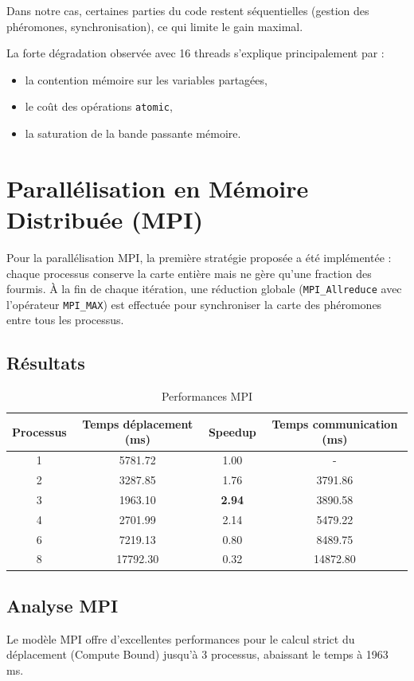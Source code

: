 \documentclass[12pt, a4paper]{article}
\begin{document}
Dans notre cas, certaines parties du code restent séquentielles (gestion des phéromones, synchronisation), ce qui limite le gain maximal.

La forte dégradation observée avec 16 threads s’explique principalement par :

\begin{itemize}
\item la contention mémoire sur les variables partagées,
\item le coût des opérations \texttt{atomic},
\item la saturation de la bande passante mémoire.
\end{itemize}

\section{Parallélisation en Mémoire Distribuée (MPI)}

Pour la parallélisation MPI, la première stratégie proposée a été implémentée : chaque processus conserve la carte entière mais ne gère qu'une fraction des fourmis. À la fin de chaque itération, une réduction globale (\texttt{MPI\_Allreduce} avec l'opérateur \texttt{MPI\_MAX}) est effectuée pour synchroniser la carte des phéromones entre tous les processus.

\subsection{Résultats}

\begin{table}[H]
\centering
\begin{tabular}{cccc}
\toprule
Processus & Temps déplacement (ms) & Speedup & Temps communication (ms) \\
\midrule
1 & 5781.72 & 1.00 & - \\
2 & 3287.85 & 1.76 & 3791.86 \\
3 & 1963.10 & \textbf{2.94} & 3890.58 \\
4 & 2701.99 & 2.14 & 5479.22 \\
6 & 7219.13 & 0.80 & 8489.75 \\
8 & 17792.30 & 0.32 & 14872.80 \\
\bottomrule
\end{tabular}
\caption{Performances MPI}
\end{table}

\subsection{Analyse MPI}
Le modèle MPI offre d'excellentes performances pour le calcul strict du déplacement (Compute Bound) jusqu'à 3 processus, abaissant le temps à 1963 ms. 
\end{document}
